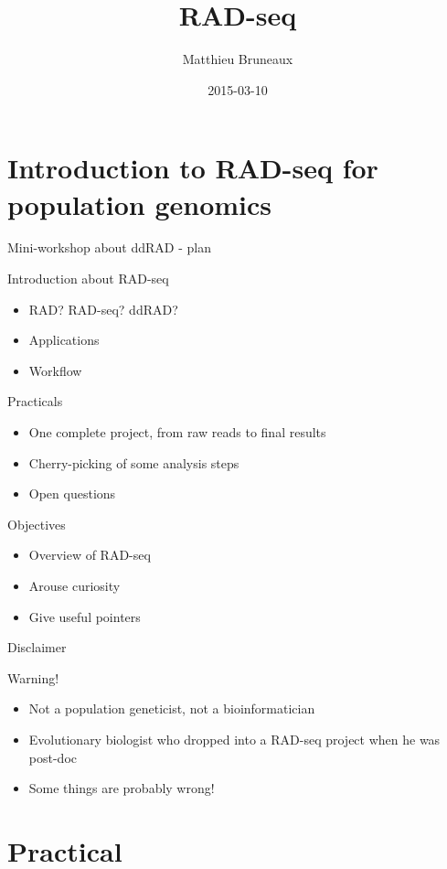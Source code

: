 \documentclass[big]{beamer}
\author{Matthieu Bruneaux}
\date{2015-03-10}
\title{RAD-seq}
\begin{document}
\maketitle

\section{Introduction to RAD-seq for population genomics}
\label{sec-1}

\begin{frame}[label=sec-1-1]{Mini-workshop about ddRAD - plan}
\begin{block}{Introduction about RAD-seq}
\begin{itemize}
\item RAD? RAD-seq? ddRAD?
\item Applications
\item Workflow
\end{itemize}
\end{block}
\begin{block}{Practicals}
\begin{itemize}
\item One complete project, from raw reads to final results
\item Cherry-picking of some analysis steps
\item Open questions
\end{itemize}
\end{block}
\begin{block}{Objectives}
\begin{itemize}
\item Overview of RAD-seq
\item Arouse curiosity
\item Give useful pointers
\end{itemize}
\end{block}
\end{frame}
\begin{frame}[label=sec-1-2]{Disclaimer}
\begin{block}{Warning!}
\begin{itemize}
\item Not a population geneticist, not a bioinformatician
\item Evolutionary biologist who dropped into a RAD-seq project when he was
post-doc
\item Some things are probably wrong!
\end{itemize}
\end{block}
\end{frame}
\section{Practical}
\label{sec-2}
\end{document}
